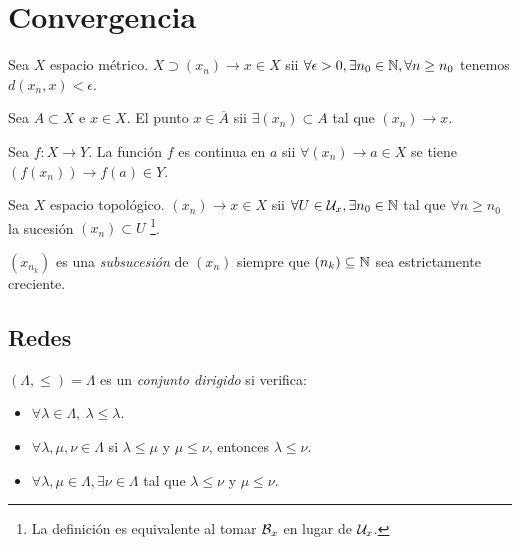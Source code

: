 \section*{Convergencia}

\begin{definition}
    Sea \(X\) espacio métrico. \(X\supset (x_n) \to x \in X\) sii \(\forall \epsilon >0,\exists n_0\in \mathbb{N}, \forall n\geq n_0 \) tenemos \(d(x_n,x)<\epsilon\). 
\end{definition}
\begin{proposition}
    Sea \(A\subset X\) e \(x\in X \). El punto \(x\in \overline{A}\) sii \( \exists(x_n) \subset A\) tal que \((x_n)\to x\). 
\end{proposition}
\begin{proposition}
    Sea \(f:X\to Y \). La función \(f\) es continua en \(a \) sii \(\forall (x_n) \to a \in X\) se tiene \((f(x_n)) \to f(a) \in Y\). 
\end{proposition}
\begin{definition}
    Sea \(X\) espacio topológico. \((x_n)\to x \in X\) sii \(\forall U\in \mathcal{U}_x,\exists n_0\in \mathbb{N}\) tal que \(\forall n\geq n_0\) la sucesión \((x_n)\subset U\) \footnote{La definición es equivalente al tomar \(\mathcal{B}_x\) en lugar de \(\mathcal{U}_x\). }.  
\end{definition}
\begin{definition}
    \((x_{n_k})\) es una \emph{subsucesión} de \((x_n)\) siempre que \((n_k)\subseteq \mathbb{N}\) sea estrictamente creciente. 
\end{definition}

\subsection*{Redes}

\begin{definition}
    \((\Lambda,\leq) = \Lambda\) es un \emph{conjunto dirigido} si verifica: 
    \begin{itemize}
        \item \(\forall \lambda \in \Lambda, \ \lambda\leq \lambda\). 
        \item \(\forall \lambda,\mu, \nu\in \Lambda \) si \(\lambda \leq \mu\) y \(\mu\leq \nu\), entonces \(\lambda\leq \nu\). 
        \item \(\forall \lambda,\mu \in \Lambda, \exists \nu\in \Lambda\) tal que \(\lambda\leq \nu\) y \(\mu\leq \nu\). 
   \end{itemize}
\end{definition}

